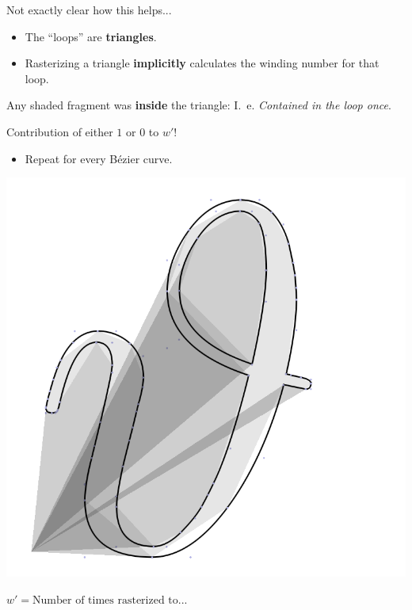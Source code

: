 \documentclass[14pt]{beamer}
\begin{document}
\begin{frame}
    \centering
    Not exactly clear how this helps...
\end{frame}

\begin{frame}
    \begin{itemize}
        \item<1-> The ``loops'' are \textbf{triangles}.
        \item<2-> Rasterizing a triangle \textbf{implicitly} calculates the winding number for that loop.
    \end{itemize}
    \pause
    Any shaded fragment was \textbf{inside} the triangle: I.~e. \textit{Contained in the loop once}.

    \centering\vspace{1.5em}
    Contribution of either $1$ or $0$ to $w'$!

    \vspace{1.5em}


    \begin{itemize}
        \item Repeat for every Bézier curve.
    \end{itemize}

\end{frame}

\begin{frame}
    \centering
    \includegraphics[height=0.625\textheight]{demo/step1.png}


    $w' = \text{Number of times rasterized to...}$
\end{frame}
\end{document}
